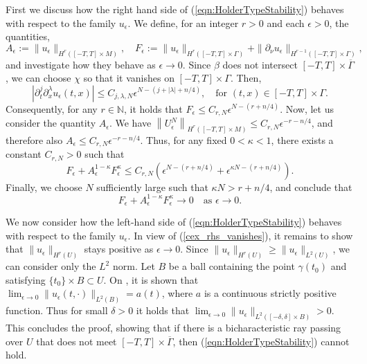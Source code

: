 \documentclass[final,leqno]{siamart1116}
\begin{document}
First we discuss how the right hand side of
(\ref{eqn:HolderTypeStability}) behaves with respect to the family
$u_\epsilon$.
We define, for an integer $r > 0 $ and each $\epsilon
>0$, the quantities, 
$$
A_\epsilon := \|u_\epsilon\|_{H^r([-T,T]\times
  M)}, \quad F_\epsilon := \|u_\epsilon\|_{H^r([-T,T]\times\Gamma)} +
\|{\partial}_\nu u_\epsilon\|_{H^{r-1}([-T,T]\times\Gamma)},
$$ 
and investigate
how they behave as $\epsilon \rightarrow 0$. 
Since $\beta$ does not intersect 
$[-T,T] \times \overline{\Gamma}$, we can
choose $\chi$ so that it vanishes on $[-T,T]\times \Gamma$. Then,
\begin{equation*}
  |{\partial}_t^j {\partial}_x^\lambda u_\epsilon(t,x)| \leq C_{j,\lambda,N} \epsilon^{N - (j + |\lambda| + n/4)}, \quad \text{for $(t,x) \in [-T,T]\times\Gamma$}.
\end{equation*}
Consequently, for any $r \in \mathbb{N}$, it holds that $F_\epsilon \leq C_{r,N} \epsilon^{N - (r + n/4)}$.
Now, let us consider the quantity $A_\epsilon$. 
We have ${\left\|{U_\epsilon^N} \right\|}_{H^r([-T,T] \times M)} \le C_{r,N} \epsilon^{-r-n/4}$, and therefore also
$A_\epsilon \leq C_{r,N} \epsilon^{-r-n/4}$.
Thus, for any fixed $0 < \kappa < 1$, there exists a constant $C_{r,N} > 0$
such that
\begin{equation*}
  F_\epsilon + A_\epsilon^{1 - \kappa} F_\epsilon^{\kappa} \leq C_{r,N}
  \left(\epsilon^{N - (r + n/4)} + \epsilon^{\kappa N - (r + n/4)}\right).
\end{equation*}
Finally, we choose $N$ sufficiently large such that $\kappa N > r + n/4$,
and conclude that
\begin{equation}
\label{cex_rhs_vanishes}
  F_\epsilon + A_\epsilon^{1-\kappa} F_\epsilon^{\kappa} \rightarrow 0 \quad\text{as $\epsilon \rightarrow 0$.}
\end{equation}

We now consider how the left-hand side of
(\ref{eqn:HolderTypeStability}) behaves with respect to the family
$u_\epsilon$. 
In view of (\ref{cex_rhs_vanishes}),
it remains to show that $\|u_\epsilon\|_{H^r(U)}$ stays positive as $\epsilon \rightarrow 0$. Since $\|u_\epsilon\|_{H^r(U)} \geq \|u_\epsilon \|_{L^2(U)}$, we can consider only the $L^2$ norm. Let $B$ be a ball
containing the point $\gamma(t_0)$
and satisfying $\{t_0\} \times B \subset U$. On \cite[p. 176]{Katchalov2001}, it
is shown that $\lim_{\epsilon \rightarrow 0}
\|u_\epsilon(t,\cdot)\|_{L^2(B)} = a(t)$, where $a$ is
a continuous strictly positive function. 
Thus for small $\delta > 0$ it holds that $\lim_{\epsilon \rightarrow 0}
\|u_\epsilon \|_{L^2([-\delta, \delta] \times B)} > 0$.
This concludes the proof, showing that if there is a bicharacteristic ray
passing over $U$ that does not meet $[-T,T]\times \overline{\Gamma}$,
then (\ref{eqn:HolderTypeStability}) cannot hold. 
\end{document}
